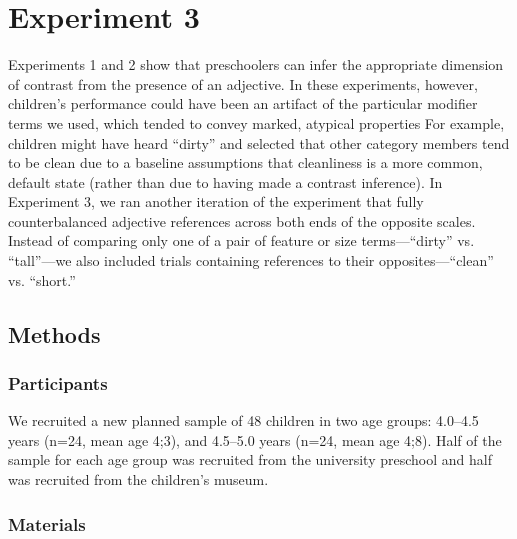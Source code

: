 \documentclass[man]{apa2}
\begin{document}


\section{Experiment 3} 

Experiments 1 and 2 show that preschoolers can infer the appropriate dimension of contrast from the presence of an adjective. In these experiments, however, children's performance could have been an artifact of the particular modifier terms we used, which tended to convey marked, atypical properties For example, children might have heard ``dirty'' and selected that other category members tend to be clean due to a baseline assumptions that cleanliness is a more common, default state (rather than due to having made a contrast inference). In Experiment 3, we ran another iteration of the experiment that fully counterbalanced adjective references across both ends of the opposite scales. Instead of comparing only one of a pair of feature or size terms---``dirty'' vs. ``tall''---we also included trials containing references to their opposites---``clean'' vs. ``short.''  

\subsection{Methods}

\subsubsection{Participants}

We recruited a new planned sample of 48 children in two age groups: 4.0--4.5 years (n=24, mean age 4;3), and 4.5--5.0 years (n=24, mean age 4;8).  Half of the sample for each age group was recruited from the university preschool and half was recruited from the children's museum.

\subsubsection{Materials}
\end{document}
